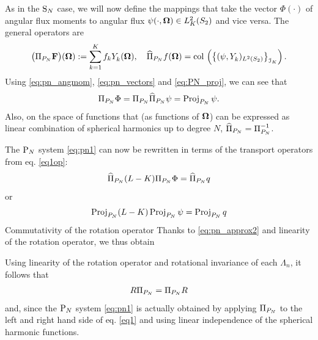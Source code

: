 As in the $\SN$ case, we will now define the mappings that take the vector $\Phi(\cdot)$ of angular flux moments to
angular flux $\psi(\cdot,\bomega)\in\Lp[2]_K(\Sphere)$ and vice versa. The general operators are
$$
\bigl(\PiPN\mat{F}\bigr)(\bomega) := \sum_{k=1}^{ K} f_k\Y{k}{}(\bomega), \quad
\PihPN f(\bomega) = \col\left( \left\{(\psi, \Y{k}{})_{\Lp[2](\Sphere)}\right\}_{\idxset{K}} \right).
$$
Using \eqref{eq:pn_angmom}, \eqref{eq:pn_vectors} and \eqref{eq:PN_proj}, we can see that 
$$
\PiPN\Phi = \PiPN\PihPN \psi = \Projop\psi.
$$ 
Also, on the space of functions that (as functions of $\bomega$) can be expressed as linear combination of
spherical harmonics up to degree $N$, $\PihPN = \PiPN^{-1}$.

The $\PN$ system \eqref{eq:pn1} can now be rewritten in terms of the transport operators from eq. \eqref{eq1op}:
$$
	\PihPN (L-K) \PiPN\Phi = \PihPN q
$$
or
$$
	\Projop (L-K) \Projop\psi = \Projop q
$$
Commutativity of the rotation operator 
Thanks to \eqref{eq:pn_approx2} and linearity of the rotation operator, we thus obtain

Using linearity of the rotation operator and rotational
invariance of each $\Lambda_n$, it follows that 
$$
	\op{R}\PiPN = \PiPN\op{R}
$$
and, since the $\PN$ system \eqref{eq:pn1} is actually obtained by applying $\PiPN$ to the left and right
hand side of eq. \eqref{eq1} and using linear independence of the spherical harmonic functions. 


